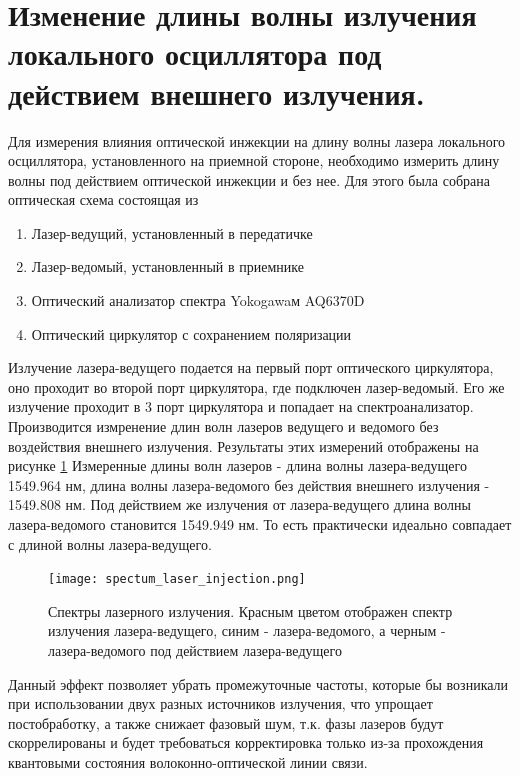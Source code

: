 \section{Изменение длины волны излучения локального осциллятора под действием внешнего излучения.}\label{sec:ch2/sect7}
Для измерения влияния оптической инжекции на длину волны лазера локального осциллятора, установленного на приемной стороне, необходимо измерить длину волны под действием оптической инжекции и без нее. 
Для этого была собрана оптическая схема состоящая из
\begin{enumerate}
    \item Лазер-ведущий, установленный в передатичке
    \item Лазер-ведомый, установленный в приемнике
    \item Оптический анализатор спектра Yokogawaм AQ6370D
    \item Оптический циркулятор с сохранением поляризации
\end{enumerate}
Излучение лазера-ведущего подается на первый порт оптического циркулятора, оно проходит во второй порт циркулятора, где подключен лазер-ведомый. Его же излучение проходит в 3 порт циркулятора и попадает на спектроанализатор.
Производится измренение длин волн лазеров ведущего и ведомого без воздействия внешнего излучения. Результаты этих измерений отображены на рисунке \ref*{fig:spectrums_injection}
Измеренные длины волн лазеров - длина волны лазера-ведущего 1549.964 нм, длина волны лазера-ведомого без действия внешнего излучения - 1549.808 нм. Под действием же излучения от лазера-ведущего длина волны лазера-ведомого становится 1549.949 нм. То есть практически идеально совпадает с длиной волны лазера-ведущего.
\begin{figure}
    \centering
    \texttt{[image: spectum\_laser\_injection.png]}
    \caption*{Спектры лазерного излучения. Красным цветом отображен спектр излучения лазера-ведущего, синим - лазера-ведомого, а черным - лазера-ведомого под действием лазера-ведущего}
    \label{fig:spectrums_injection}
\end{figure}
Данный эффект позволяет убрать промежуточные частоты, которые бы возникали при использовании двух разных источников излучения, что упрощает постобработку, а также снижает фазовый шум, т.к. фазы лазеров будут скоррелированы и будет требоваться корректировка только из-за прохождения квантовыми состояния волоконно-оптической линии связи.
